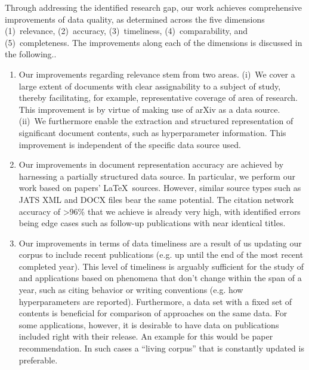 Through addressing the identified research gap, our work achieves comprehensive improvements of data quality, as determined across the five dimensions (1)~relevance, (2)~accuracy, (3)~timeliness, (4)~comparability, and (5)~completeness. The improvements along each of the dimensions is discussed in the following..

\begin{enumerate}
\item Our improvements regarding relevance stem from two areas. (i)~We cover a large extent of documents with clear assignability to a subject of study, thereby facilitating, for example, representative coverage of area of research. This improvement is by virtue of making use of arXiv as a data source. (ii)~We furthermore enable the extraction and structured representation of significant document contents, such as hyperparameter information. This improvement is independent of the specific data source used.
\item Our improvements in document representation accuracy are achieved by harnessing a partially structured data source. In particular, we perform our work based on papers' \LaTeX\ sources. However, similar source types such as JATS XML and DOCX files bear the same potential. %
The citation network accuracy of >96\% that we achieve is already very high, with identified errors being edge cases such as follow-up publications with near identical titles. %
\item Our improvements in terms of data timeliness are a result of us updating our corpus to include recent publications (e.g. up until the end of the most recent completed year). This level of timeliness is arguably sufficient for the study of and applications based on phenomena that don't change within the span of a year, such as citing behavior or writing conventions (e.g. how hyperparameters are reported). Furthermore, a data set with a fixed set of contents is beneficial for comparison of approaches on the same data. For some applications, however, it is desirable to have data on publications included right with their release. An example for this would be paper recommendation. In such cases a ``living corpus'' that is constantly updated is preferable. %

\end{enumerate}
